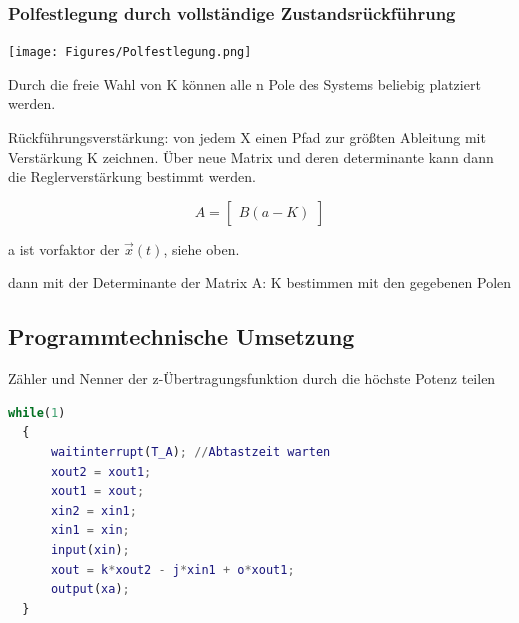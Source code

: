 \documentclass[10pt,a4paper]{article}
\begin{document}
\subsubsection{Polfestlegung durch vollständige Zustandsrückführung}

\centering
\texttt{[image: Figures/Polfestlegung.png]}

\raggedright
Durch die freie Wahl von K können alle n Pole des Systems beliebig platziert
werden.

Rückführungsverstärkung: von jedem X einen Pfad zur größten Ableitung
mit Verstärkung K zeichnen. Über neue Matrix und deren determinante kann dann
die Reglerverstärkung bestimmt werden.

\begin{mdframed}
\[
	A = \begin{bmatrix}
		B(a-K)
    \end{bmatrix}
\]
\begin{center}
    \footnotesize a ist vorfaktor der $\vec{x}(t)$, siehe oben.
\end{center}
\end{mdframed}

dann mit der Determinante der Matrix A: K bestimmen mit den gegebenen Polen

\subsection{Programmtechnische Umsetzung}
Zähler und Nenner der z-Übertragungsfunktion durch die höchste Potenz teilen

\begin{lstlisting}[language=Matlab]
  while(1)
  {
      waitinterrupt(T_A); //Abtastzeit warten
      xout2 = xout1;
      xout1 = xout;
      xin2 = xin1;
      xin1 = xin;
      input(xin);
      xout = k*xout2 - j*xin1 + o*xout1;
      output(xa);
  }
\end{lstlisting}
\end{document}
